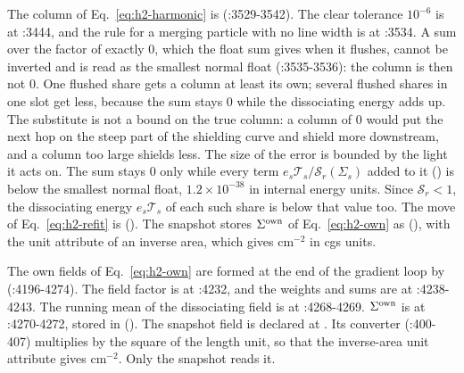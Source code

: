 The column of Eq.~\eqref{eq:h2-harmonic} is
 (:3529-3542). The clear
tolerance $10^{-6}$ is at :3444, and the rule for a merging particle with no
line width is at :3534. A sum over the factor of exactly 0, which the
float sum gives when it flushes, cannot be inverted and is read as the smallest normal
float (:3535-3536): the column is then not 0. One flushed share gets a column at least its own; several
flushed shares in one slot get less, because the sum stays 0 while the dissociating
energy adds up. The substitute is not a bound on the true column: a column of 0
would put the next hop on the steep part of the shielding curve and shield more downstream, and
a column too large shields less. The size of the error is bounded by the
light it acts on. The sum stays 0 only while every term
$e_s\mathcal T_s/\mathcal S_r(\Sigma_s)$ added to it () is below the
smallest normal float, $1.2\times10^{-38}$ in internal energy units. Since
$\mathcal S_r<1$, the dissociating energy $e_s\mathcal T_s$ of each such share
is below that value too. The move of Eq.~\eqref{eq:h2-refit} is
 (). The snapshot stores
$\Sigma^{\rm own}$ of Eq.~\eqref{eq:h2-own} as 
(), with the unit
attribute of an inverse area, which gives cm$^{-2}$ in cgs units.

The own fields of Eq.~\eqref{eq:h2-own} are formed at the end of the gradient
loop by  (:4196-4274). The field factor
is at :4232, and the weights and sums are at :4238-4243. The running mean of
the dissociating field is at :4268-4269. $\Sigma^{\rm own}$ is at :4270-4272,
stored in  (). The
snapshot field  is declared at
. Its converter (:400-407) multiplies by the square
of the length unit, so that the inverse-area unit attribute gives cm$^{-2}$.
Only the snapshot reads it.

